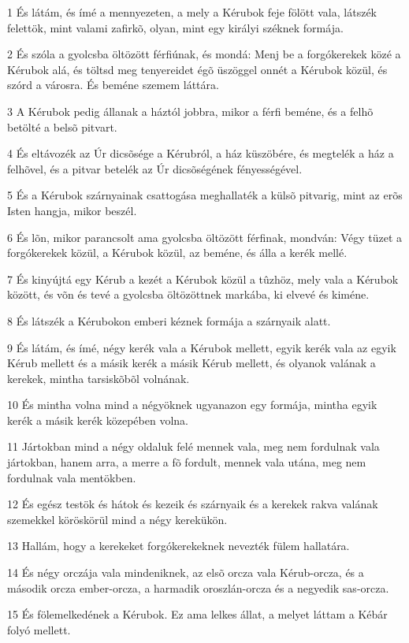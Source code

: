 \par 1 És látám, és ímé a mennyezeten, a mely a Kérubok feje fölött vala, látszék felettök, mint valami zafirkõ, olyan, mint egy királyi széknek formája.
\par 2 És szóla a gyolcsba öltözött férfiúnak, és mondá: Menj be a forgókerekek közé a Kérubok alá, és töltsd meg tenyereidet égõ üszöggel onnét a Kérubok közül, és szórd a városra. És beméne szemem láttára.
\par 3 A Kérubok pedig állanak a háztól jobbra, mikor a férfi beméne, és a felhõ betölté a belsõ pitvart.
\par 4 És eltávozék az Úr dicsõsége a Kérubról, a ház küszöbére, és megtelék a ház a felhõvel, és a pitvar betelék az Úr dicsõségének fényességével.
\par 5 És a Kérubok szárnyainak csattogása meghallaték a külsõ pitvarig, mint az erõs Isten hangja, mikor beszél.
\par 6 És lõn, mikor parancsolt ama gyolcsba öltözött férfinak, mondván: Végy tüzet a forgókerekek közül, a Kérubok közül, az beméne, és álla a kerék mellé.
\par 7 És kinyújtá egy Kérub a kezét a Kérubok közül a tûzhöz, mely vala a Kérubok között, és võn és tevé a gyolcsba öltözöttnek markába, ki elvevé és kiméne.
\par 8 És látszék a Kérubokon emberi kéznek formája a szárnyaik alatt.
\par 9 És látám, és ímé, négy kerék vala a Kérubok mellett, egyik kerék vala az egyik Kérub mellett és a másik kerék a másik Kérub mellett, és olyanok valának a kerekek, mintha tarsiskõbõl volnának.
\par 10 És mintha volna mind a négyöknek ugyanazon egy formája, mintha egyik kerék a másik kerék közepében volna.
\par 11 Jártokban mind a négy oldaluk felé mennek vala, meg nem fordulnak vala jártokban, hanem arra, a merre a fõ fordult, mennek vala utána, meg nem fordulnak vala mentökben.
\par 12 És egész testök és hátok és kezeik és szárnyaik és a kerekek rakva valának szemekkel köröskörül mind a négy kerekükön.
\par 13 Hallám, hogy a kerekeket forgókerekeknek nevezték fülem hallatára.
\par 14 És négy orczája vala mindeniknek, az elsõ orcza vala Kérub-orcza, és a második orcza ember-orcza, a harmadik oroszlán-orcza és a negyedik sas-orcza.
\par 15 És fölemelkedének a Kérubok. Ez ama lelkes állat, a melyet láttam a Kébár folyó mellett.
